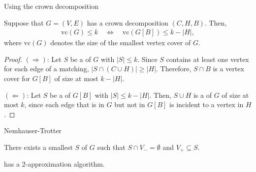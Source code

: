 \begin{frame}{Using the crown decomposition}
 \begin{lemma}
  Suppose that $G=(V,E)$ has a crown decomposition $(C,H,B)$. Then,
  \begin{align*}
   \text{vc}(G) \le k \quad\Leftrightarrow\quad \text{vc}(G[B]) \le k-|H|,
  \end{align*}
  where $\text{vc}(G)$ denotes the size of the smallest vertex cover of $G$.
 \end{lemma}
 \pause
 \begin{proof}
  $(\Rightarrow)$: Let $S$ be a \vc of $G$ with $|S|\le k$. Since $S$ contains at least one vertex for each edge of a matching, $|S \cap (C\cup H)| \ge |H|$. Therefore, $S\cap B$ is a vertex cover for $G[B]$ of size at most $k-|H|$.
  
  $(\Leftarrow)$: Let $S$ be a \vc of $G[B]$ with $|S|\le k-|H|$. Then, $S\cup H$ is a \vc of $G$ of size at most $k$, since each edge that is in $G$ but not in $G[B]$ is incident to a vertex in $H$.
 \end{proof}

\end{frame}


\begin{frame}{Nemhauser-Trotter}

 \begin{corollary}
  There exists a smallest \vc $S$ of $G$ such that $S\cap V_- = \emptyset$ and $V_+ \subseteq S$.
 \end{corollary}

\begin{corollary}
	\VC has a 2-approximation algorithm.
\end{corollary}

\end{frame}



